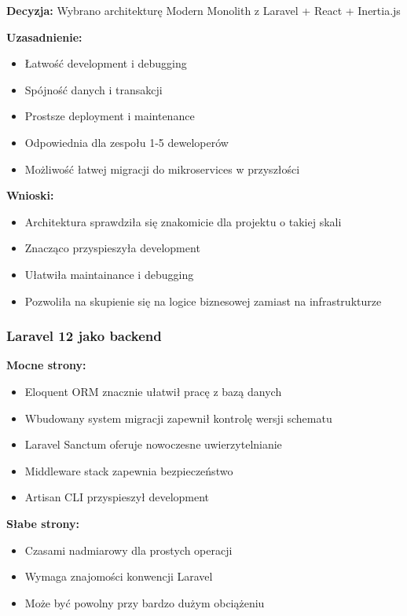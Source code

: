 \documentclass[12pt,a4paper]{article}
\begin{document}
    \textbf{Decyzja:} Wybrano architekturę Modern Monolith z Laravel + React + Inertia.js

    \textbf{Uzasadnienie:}
    \begin{itemize}
        \item Łatwość development i debugging
        \item Spójność danych i transakcji
        \item Prostsze deployment i maintenance
        \item Odpowiednia dla zespołu 1-5 deweloperów
        \item Możliwość łatwej migracji do mikroservices w przyszłości
    \end{itemize}

    \textbf{Wnioski:}
    \begin{itemize}
        \item Architektura sprawdziła się znakomicie dla projektu o takiej skali
        \item Znacząco przyspieszyła development
        \item Ułatwiła maintainance i debugging
        \item Pozwoliła na skupienie się na logice biznesowej zamiast na infrastrukturze
    \end{itemize}

    \subsubsection{Laravel 12 jako backend}

    \textbf{Mocne strony:}
    \begin{itemize}
        \item Eloquent ORM znacznie ułatwił pracę z bazą danych
        \item Wbudowany system migracji zapewnił kontrolę wersji schematu
        \item Laravel Sanctum oferuje nowoczesne uwierzytelnianie
        \item Middleware stack zapewnia bezpieczeństwo
        \item Artisan CLI przyspieszył development
    \end{itemize}

    \textbf{Słabe strony:}
    \begin{itemize}
        \item Czasami nadmiarowy dla prostych operacji
        \item Wymaga znajomości konwencji Laravel
        \item Może być powolny przy bardzo dużym obciążeniu
    \end{itemize}
\end{document}
